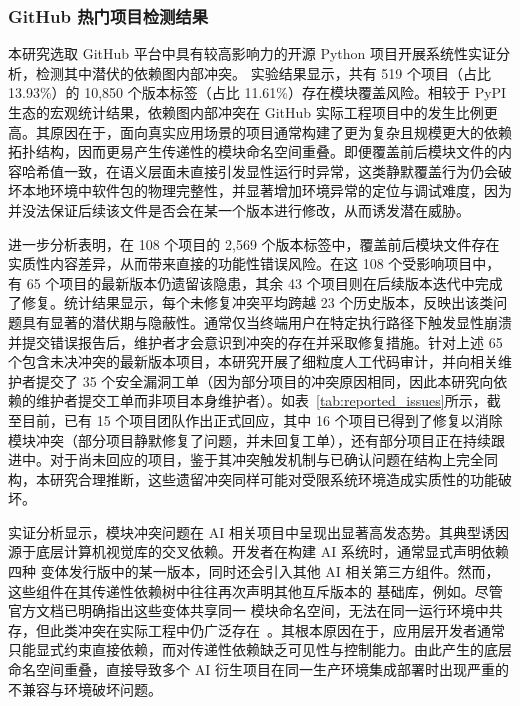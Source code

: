 \subsubsection{GitHub 热门项目检测结果}
本研究选取 GitHub 平台中具有较高影响力的开源 Python 项目开展系统性实证分析，检测其中潜伏的依赖图内部冲突。
实验结果显示，共有 519 个项目（占比 13.93\%）的 10,850 个版本标签（占比 11.61\%）存在模块覆盖风险。相较于 PyPI 生态的宏观统计结果，依赖图内部冲突在 GitHub 实际工程项目中的发生比例更高。其原因在于，面向真实应用场景的项目通常构建了更为复杂且规模更大的依赖拓扑结构，因而更易产生传递性的模块命名空间重叠。即便覆盖前后模块文件的内容哈希值一致，在语义层面未直接引发显性运行时异常，这类静默覆盖行为仍会破坏本地环境中软件包的物理完整性，并显著增加环境异常的定位与调试难度，因为并没法保证后续该文件是否会在某一个版本进行修改，从而诱发潜在威胁。

进一步分析表明，在 108 个项目的 2,569 个版本标签中，覆盖前后模块文件存在实质性内容差异，从而带来直接的功能性错误风险。在这 108 个受影响项目中，有 65 个项目的最新版本仍遗留该隐患，其余 43 个项目则在后续版本迭代中完成了修复。统计结果显示，每个未修复冲突平均跨越 23 个历史版本，反映出该类问题具有显著的潜伏期与隐蔽性。通常仅当终端用户在特定执行路径下触发显性崩溃并提交错误报告后，维护者才会意识到冲突的存在并采取修复措施。针对上述 65 个包含未决冲突的最新版本项目，本研究开展了细粒度人工代码审计，并向相关维护者提交了 35 个安全漏洞工单（因为部分项目的冲突原因相同，因此本研究向依赖的维护者提交工单而非项目本身维护者）。如表~\ref{tab:reported_issues}所示，截至目前，已有 15 个项目团队作出正式回应，其中 16 个项目已得到了修复以消除模块冲突（部分项目静默修复了问题，并未回复工单），还有部分项目正在持续跟进中。对于尚未回应的项目，鉴于其冲突触发机制与已确认问题在结构上完全同构，本研究合理推断，这些遗留冲突同样可能对受限系统环境造成实质性的功能破坏。

实证分析显示，模块冲突问题在 AI 相关项目中呈现出显著高发态势。其典型诱因源于底层计算机视觉库的交叉依赖。开发者在构建 AI 系统时，通常显式声明依赖四种  变体发行版中的某一版本，同时还会引入其他 AI 相关第三方组件。然而，这些组件在其传递性依赖树中往往再次声明其他互斥版本的  基础库，例如。尽管官方文档已明确指出这些变体共享同一  模块命名空间，无法在同一运行环境中共存，但此类冲突在实际工程中仍广泛存在~\cite{opencv}。其根本原因在于，应用层开发者通常只能显式约束直接依赖，而对传递性依赖缺乏可见性与控制能力。由此产生的底层命名空间重叠，直接导致多个 AI 衍生项目在同一生产环境集成部署时出现严重的不兼容与环境破坏问题。

